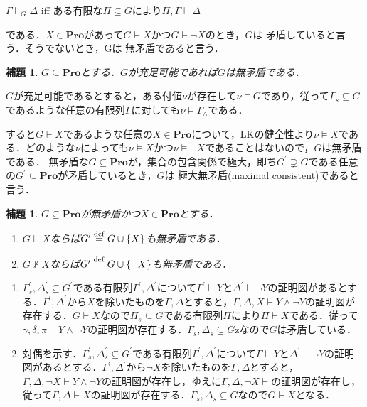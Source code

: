 \documentclass{ltjsarticle}
\makeatletter
\theoremstyle{mystyle1}
\theoremstyle{mystyle3}
\newtheorem{lem}[cor]{補題}
\theoremstyle{mystyle2}
\renewenvironment{proof}[1][\proofname]{\par
  \pushQED{\qed}%
  \normalfont
  \topsep6\p@\@plus6\p@ \trivlist
  \item[\hskip\labelsep{\bfseries\sffamily #1}]\ignorespaces
}{%
  \popQED\endtrivlist\@endpefalse
}
\renewcommand\proofname{証明:}
\newcommand{\bPro}{\ensuremath{\mathbf{Pro}}}
\newcommand{\dequal}{\ensuremath{\stackrel{\rm{def}}{=}}}
\newcommand{\red}[1]{{\color{red} #1}}
\makeatother
\begin{document}
\begin{center}
  $\Gamma\vdash_G\Delta$ iff ある有限な$\Pi\subseteq G$により$\Pi,\Gamma\vdash\Delta$
\end{center}

である．$X\in\bPro$があって$G\vdash X$かつ$G\vdash\neg X$のとき，$G$は\red{矛盾している}と言う．そうでないとき，Gは\red{無矛盾である}と言う．
\begin{lem}
  $G\subseteq\bPro$とする．$G$が充足可能であれば$G$は無矛盾である．
\end{lem}
\begin{proof}
  $G$が充足可能であるとすると，ある付値$\nu$が存在して$\nu\models G$であり，従って$\Gamma_s\subseteq G$であるような任意の有限列$\Gamma$に対しても$\nu\models\Gamma_\wedge$である．

  すると$G\vdash X$であるような任意の$X\in\bPro$について，LKの健全性より$\nu\models X$である．どのような$\nu$によっても$\nu\models X$かつ$\nu\models\neg X$であることはないので，$G$は無矛盾である．
\end{proof}
無矛盾な$G\subseteq\bPro$が，集合の包含関係で極大，即ち$G^\prime\supsetneq G$である任意の$G^\prime\subseteq\bPro$が矛盾しているとき，$G$は\red{極大無矛盾}(maximal consistent)であると言う．
\begin{lem}
  $G\subseteq\bPro$が無矛盾かつ$X\in\bPro$とする．
  \begin{enumerate}
    \item $G\vdash X$ならば$G^\prime\dequal G\cup\qty{X}$も無矛盾である．
    \item $G\not\vdash X$ならば$G^\prime\dequal G\cup\qty{\neg X}$も無矛盾である．
  \end{enumerate}
\end{lem}
\begin{proof}
  \begin{enumerate}
    \item $\Gamma_s^\prime,\Delta_s^\prime\subseteq G^\prime$である有限列$\Gamma^\prime,\Delta^\prime$について$\Gamma^\prime\vdash Y$と$\Delta^\prime\vdash\neg Y$の証明図があるとする．$\Gamma^\prime,\Delta^\prime$から$X$を除いたものを$\Gamma,\Delta$とすると，$\Gamma,\Delta,X\vdash Y\wedge\neg Y$の証明図が存在する．$G\vdash X$なので$\Pi_s\subseteq G$である有限列$\Pi$により$\Pi\vdash X$である．従って$\gamma,\delta,\pi\vdash Y\wedge\neg Y$の証明図が存在する．$\Gamma_s,\Delta_s\subseteq G$zなので$G$は矛盾している．
    \item 対偶を示す．$\Gamma_s^\prime,\Delta_s^\prime\subseteq G^\prime$である有限列$\Gamma^\prime,\Delta^\prime$について$\Gamma\vdash Y$と$\Delta^\prime\vdash\neg Y$の証明図があるとする．$\Gamma^\prime,\Delta^\prime$から$\neg X$を除いたものを$\Gamma,\Delta$とすると，$\Gamma,\Delta,\neg X\vdash Y\wedge\neg Y$の証明図が存在し，ゆえに$\Gamma,\Delta,\neg X\vdash$の証明図が存在し，従って$\Gamma,\Delta\vdash X$の証明図が存在する．$\Gamma_s,\Delta_s\subseteq G$なので$G\vdash X$となる．
  \end{enumerate}
\end{proof}
\end{document}
